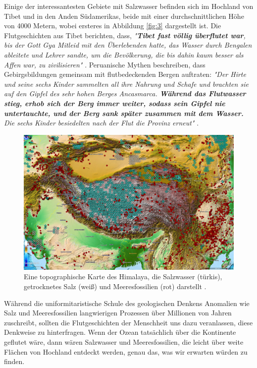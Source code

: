 \documentclass[10pt,twocolumn,letterpaper]{article}
\begin{document}
Einige der interessantesten Gebiete mit Salzwasser befinden sich im Hochland von Tibet und in den Anden Südamerikas, beide mit einer durchschnittlichen Höhe von 4000 Metern, wobei ersteres in Abbildung \ref{fig:3} dargestellt ist. Die Flutgeschichten aus Tibet berichten, dass, \textit{"\textbf{Tibet fast völlig überflutet war}, bis der Gott Gya Mitleid mit den Überlebenden hatte, das Wasser durch Bengalen ableitete und Lehrer sandte, um die Bevölkerung, die bis dahin kaum besser als Affen war, zu zivilisieren"} \cite{3}. Peruanische Mythen beschreiben, dass Gebirgsbildungen gemeinsam mit flutbedeckenden Bergen auftraten: \textit{"Der Hirte und seine sechs Kinder sammelten all ihre Nahrung und Schafe und brachten sie auf den Gipfel des sehr hohen Berges Ancasmarca. \textbf{Während das Flutwasser stieg, erhob sich der Berg immer weiter, sodass sein Gipfel nie untertauchte, und der Berg sank später zusammen mit dem Wasser.} Die sechs Kinder besiedelten nach der Flut die Provinz erneut"} \cite{3}.

\begin{figure}[t]

\begin{center}
   \includegraphics[width=1\linewidth]{tibet.jpg}
\end{center}
   \caption{Eine topographische Karte des Himalaya, die Salzwasser (türkis), getrocknetes Salz (weiß) und Meeresfossilien (rot) darstellt \cite{15,16,86,87}.}
\label{fig:3}
\label{fig:onecol}
\end{figure}

Während die uniformitaristische Schule des geologischen Denkens Anomalien wie Salz und Meeresfossilien langwierigen Prozessen über Millionen von Jahren zuschreibt, sollten die Flutgeschichten der Menschheit uns dazu veranlassen, diese Denkweise zu hinterfragen. Wenn der Ozean tatsächlich über die Kontinente geflutet wäre, dann wären Salzwasser und Meeresfossilien, die leicht über weite Flächen von Hochland entdeckt werden, genau das, was wir erwarten würden zu finden.
\end{document}
